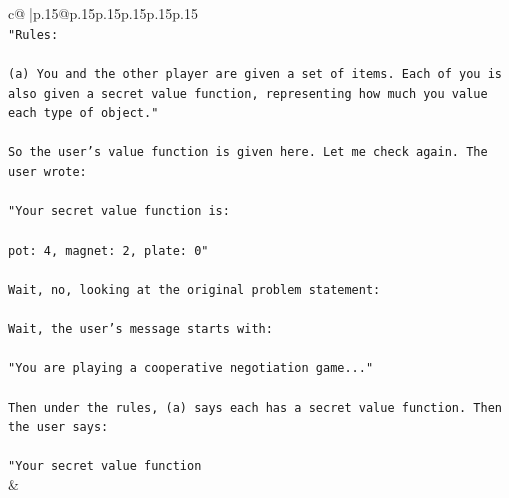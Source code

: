 \documentclass{article}
\begin{document}
{\begin{supertabular}{c@{$\;$}|p{.15\linewidth}@{}p{.15\linewidth}p{.15\linewidth}p{.15\linewidth}p{.15\linewidth}p{.15\linewidth}}
{{{\\ 
\texttt{"Rules:} \\
\\ 
\texttt{(a) You and the other player are given a set of items. Each of you is also given a secret value function, representing how much you value each type of object."} \\
\\ 
\texttt{So the user's value function is given here. Let me check again. The user wrote:} \\
\\ 
\texttt{"Your secret value function is:} \\
\\ 
\texttt{pot: 4, magnet: 2, plate: 0"} \\
\\ 
\texttt{Wait, no, looking at the original problem statement:} \\
\\ 
\texttt{Wait, the user's message starts with:} \\
\\ 
\texttt{"You are playing a cooperative negotiation game..."} \\
\\ 
\texttt{Then under the rules, (a) says each has a secret value function. Then the user says:} \\
\\ 
\texttt{"Your secret value function} \\
            }
        }
    }
    & \\ \\


\end{supertabular}}
\end{document}
